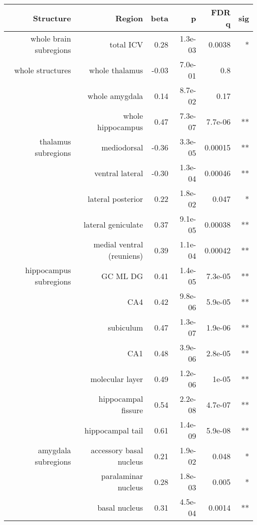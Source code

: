 \begin{longtable}{rrrrrr}
\toprule
Structure & Region & beta & p & FDR q & sig \\ 
\midrule\addlinespace[2.5pt]
whole brain subregions & total ICV & 0.28 & 1.3e-03 & 0.0038 & * \\ 
whole structures &  whole thalamus & -0.03 & 7.0e-01 & 0.8 &  \\ 
 & whole amygdala & 0.14 & 8.7e-02 & 0.17 &  \\ 
 & whole hippocampus & 0.47 & 7.3e-07 & 7.7e-06 & ** \\ 
thalamus subregions & mediodorsal & -0.36 & 3.3e-05 & 0.00015 & ** \\ 
 & ventral lateral & -0.30 & 1.3e-04 & 0.00046 & ** \\ 
 & lateral posterior & 0.22 & 1.8e-02 & 0.047 & * \\ 
 & lateral geniculate & 0.37 & 9.1e-05 & 0.00038 & ** \\ 
 & medial ventral (reuniens) & 0.39 & 1.1e-04 & 0.00042 & ** \\ 
hippocampus subregions & GC ML DG & 0.41 & 1.4e-05 & 7.3e-05 & ** \\ 
 & CA4 & 0.42 & 9.8e-06 & 5.9e-05 & ** \\ 
 & subiculum & 0.47 & 1.3e-07 & 1.9e-06 & ** \\ 
 & CA1 & 0.48 & 3.9e-06 & 2.8e-05 & ** \\ 
 & molecular layer & 0.49 & 1.2e-06 & 1e-05 & ** \\ 
 & hippocampal fissure & 0.54 & 2.2e-08 & 4.7e-07 & ** \\ 
 & hippocampal tail & 0.61 & 1.4e-09 & 5.9e-08 & ** \\ 
amygdala subregions & accessory basal nucleus & 0.21 & 1.9e-02 & 0.048 & * \\ 
 & paralaminar nucleus & 0.28 & 1.8e-03 & 0.005 & * \\ 
 & basal nucleus & 0.31 & 4.5e-04 & 0.0014 & ** \\ 
\bottomrule
\end{longtable}

